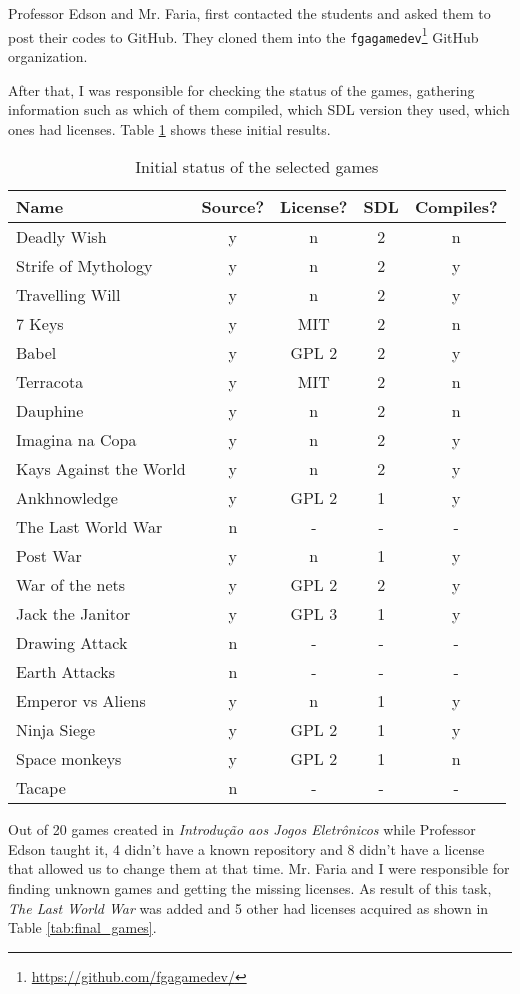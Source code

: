 Professor Edson and Mr. Faria, first contacted the students and asked them to post their codes to GitHub. They cloned them into the \texttt{fgagamedev}\footnote{ \href{https://github.com/fgagamedev}{https://github.com/fgagamedev/} } GitHub organization.


After that, I was responsible for checking the status of the games, gathering information such as which of them compiled, which SDL version they used, which ones had licenses. Table \ref{tab:first_games} shows these initial results.


\begin{table}[h!]
\centering
\caption{Initial status of the selected games}
\label{tab:first_games}
\begin{tabular}{lcccc}
\toprule
\textbf{Name} & \textbf{Source?} & \textbf{License?} & \textbf{SDL} & \textbf{Compiles?} \\
\midrule
Deadly Wish & y & n & 2 & n \\
Strife of Mythology & y & n & 2 & y \\
Travelling Will & y & n & 2 & y \\
7 Keys & y & MIT & 2 & n \\
Babel & y & GPL 2 & 2 & y \\
Terracota & y & MIT & 2 & n \\
Dauphine & y & n & 2 & n \\
Imagina na Copa & y & n & 2 & y \\
Kays Against the World & y & n & 2 & y \\
Ankhnowledge & y & GPL 2 & 1 & y \\
The Last World War & n & - & - & - \\
Post War & y & n & 1 & y \\
War of the nets & y & GPL 2 & 2 & y \\
Jack the Janitor & y & GPL 3 & 1 & y \\
Drawing Attack & n & - & - & - \\
Earth Attacks & n & - & - & - \\
Emperor vs Aliens & y & n & 1 & y \\
Ninja Siege & y & GPL 2 & 1 & y \\
Space monkeys & y & GPL 2 & 1 & n \\
Tacape & n & - & - & - \\
\bottomrule
\end{tabular}
\end{table}

Out of 20 games created in \textit{Introdu\c{c}\~ao aos Jogos Eletr\^onicos} while Professor Edson taught it, 4 didn't have a known repository and 8 didn't have a license that allowed us to change them at that time. Mr. Faria and I were responsible for finding unknown games and getting the missing licenses. As result of this task, \textit{The Last World War} was added and 5 other had licenses acquired as shown in Table \ref{tab:final_games}.

